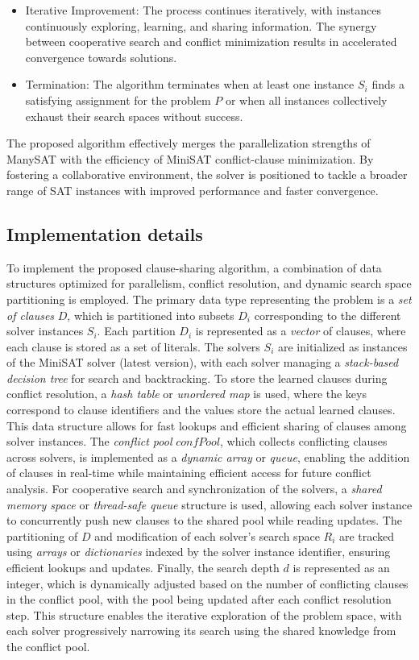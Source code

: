 \documentclass{article}
\begin{document}
\begin{itemize}
    \item Iterative Improvement: The process continues iteratively, with instances continuously exploring, learning, and sharing information. The synergy between cooperative search and conflict minimization results in accelerated convergence towards solutions.

    \item Termination: The algorithm terminates when at least one instance $S_i$ finds a satisfying assignment for the problem $P$ or when all instances collectively exhaust their search spaces without success.
\end{itemize}

The proposed algorithm effectively merges the parallelization strengths of ManySAT with the efficiency of MiniSAT conflict-clause minimization. By fostering a collaborative environment, the solver is positioned to tackle a broader range of SAT instances with improved performance and faster convergence.

\subsection{Implementation details}
To implement the proposed clause-sharing algorithm, a combination of data structures optimized for parallelism, conflict resolution, and dynamic search space partitioning is employed. The primary data type representing the problem is a \textit{set of clauses} $D$, which is partitioned into subsets $D_i$ corresponding to the different solver instances $S_i$. Each partition $D_i$ is represented as a \textit{vector} of clauses, where each clause is stored as a set of literals. The solvers $S_i$ are initialized as instances of the MiniSAT solver (latest version), with each solver managing a \textit{stack-based decision tree} for search and backtracking. To store the learned clauses during conflict resolution, a \textit{hash table} or \textit{unordered map} is used, where the keys correspond to clause identifiers and the values store the actual learned clauses. This data structure allows for fast lookups and efficient sharing of clauses among solver instances. The \textit{conflict pool} \( confPool \), which collects conflicting clauses across solvers, is implemented as a \textit{dynamic array} or \textit{queue}, enabling the addition of clauses in real-time while maintaining efficient access for future conflict analysis. For cooperative search and synchronization of the solvers, a \textit{shared memory space} or \textit{thread-safe queue} structure is used, allowing each solver instance to concurrently push new clauses to the shared pool while reading updates. The partitioning of $D$ and modification of each solver’s search space $R_i$ are tracked using \textit{arrays} or \textit{dictionaries} indexed by the solver instance identifier, ensuring efficient lookups and updates. Finally, the search depth $d $ is represented as an integer, which is dynamically adjusted based on the number of conflicting clauses in the conflict pool, with the pool being updated after each conflict resolution step. This structure enables the iterative exploration of the problem space, with each solver progressively narrowing its search using the shared knowledge from the conflict pool.
\end{document}
